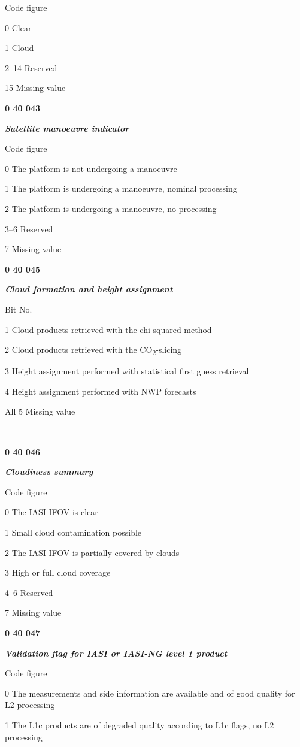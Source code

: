 Code figure

0 Clear

1 Cloud

2--14 Reserved

15 Missing value

\textbf{0 40 043}

\emph{\textbf{Satellite manoeuvre indicator}}

Code figure

0 The platform is not undergoing a manoeuvre

1 The platform is undergoing a manoeuvre, nominal processing

2 The platform is undergoing a manoeuvre, no processing

3--6 Reserved

7 Missing value

\textbf{0 40 045}

\emph{\textbf{Cloud formation and height assignment}}

Bit No.

1 Cloud products retrieved with the chi-squared method

2 Cloud products retrieved with the CO\textsubscript{2}-slicing

3 Height assignment performed with statistical first guess retrieval

4 Height assignment performed with NWP forecasts

All 5 Missing value

\textbf{\\
}

\textbf{0 40 046}

\emph{\textbf{Cloudiness summary}}

Code figure

0 The IASI IFOV is clear

1 Small cloud contamination possible

2 The IASI IFOV is partially covered by clouds

3 High or full cloud coverage

4--6 Reserved

7 Missing value

\textbf{0 40 047}

\emph{\textbf{Validation flag for IASI or IASI-NG level 1 product}}

Code figure

0 The measurements and side information are available and of good quality for L2 processing

1 The L1c products are of degraded quality according to L1c flags, no L2 processing

